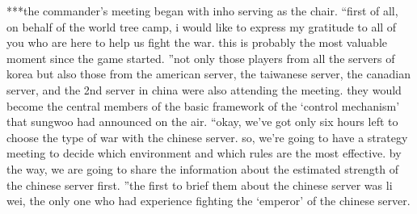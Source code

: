 ***the commander’s meeting began with inho serving as the chair.
“first of all, on behalf of the world tree camp, i would like to express my gratitude to all of you who are here to help us fight the war.
 this is probably the most valuable moment since the game started.
”not only those players from all the servers of korea but also those from the american server, the taiwanese server, the canadian server, and the 2nd server in china were also attending the meeting.
 they would become the central members of the basic framework of the ‘control mechanism’ that sungwoo had announced on the air.
“okay, we’ve got only six hours left to choose the type of war with the chinese server.
 so, we’re going to have a strategy meeting to decide which environment and which rules are the most effective.
 by the way, we are going to share the information about the estimated strength of the chinese server first.
”the first to brief them about the chinese server was li wei, the only one who had experience fighting the ‘emperor’ of the chinese server.

